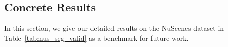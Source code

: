 \documentclass[runningheads]{llncs}
\begin{document}
	
	


	
	


	
	\subsection{Concrete Results}
	\label{results}
	In this section, we give our detailed results on the NuScenes dataset in Table~\ref{tab:nus_seg_valid} as a benchmark for future work.
\end{document}
